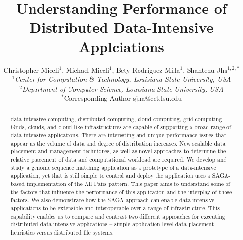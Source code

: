 \documentclass{rspublic}
\title[Understanding Performance of Distributed Data-Intensive
Applciations]{Understanding Performance of Distributed Data-Intensive
  Applciations}
\author[Miceli, Miceli, Rodriguez-Milla, Jha]{ Christopher Miceli$^{1}$,
Michael Miceli$^{1}$, Bety Rodriguez-Milla$^{1}$, Shantenu Jha$^{1,2,*}$ \\
\small{\emph{$^{1}$Center for Computation \& Technology, Louisiana State
University, USA}} \\  \small{\emph{$^{2}$Department of Computer Science,
Louisiana State University, USA}} \\ {\footnotesize {\hspace{0.0 in}
$^*$Corresponding Author sjha@cct.lsu.edu}} }
\begin{document}
 \maketitle

\begin{abstract}{data-intensive computing, distributed computing,
cloud computing, grid computing} 
Grids, clouds, and cloud-like infrastructures are capable of
supporting a broad range of data-intensive applications. There are
interesting and unique performance issues that appear as the volume of
data and degree of distribution increases. New scalable data placement
and management techniques, as well as novel approaches to determine
the relative placement of data and computational workload are
required.  We develop and study a genome sequence matching application
as a prototype of a data-intensive application, yet that is still
simple to control and deploy the application uses a SAGA-based
implementation of the All-Pairs pattern.  This paper aims to
understand some of the factors that influence the performance of this
application and the interplay of those factors. We also demonstrate
how the SAGA approach can enable data-intensive applications to be
extensible and interoperable over a range of infrastructure. This
capability enables us to compare and contrast two different approaches
for executing distributed data-intensive applications -- simple
application-level data placement heuristics versus distributed file
systems.


\end{abstract}
\end{document}
